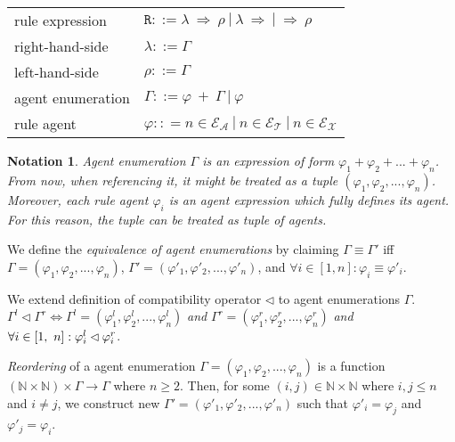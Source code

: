 \documentclass{entcs}
\renewcommand{\~}[0]{\texttildelow}
\newcommand{\choice}{|}
\newtheorem{notation}[thm]{Notation}
\begin{document}
\begin{center}
{\small
\hspace*{-1cm}\begin{tabular}{ l l }
 rule expression & $\mathtt{R} ::= \lambda ~\Rightarrow~ \rho ~|~ \lambda ~\Rightarrow ~|~ \Rightarrow~ \rho $\\
 right-hand-side & $\lambda ::= \Gamma$\\
 left-hand-side & $\rho ::= \Gamma$\\
 agent enumeration & $\Gamma ::= \varphi~ +~\Gamma ~|~ \varphi$\\
 rule agent & $\varphi :: = n \in \mathcal{E}_\mathcal{A}~\choice~n \in \mathcal{E}_\mathcal{T}~\choice~n \in \mathcal{E}_\mathcal{X}$\\
\end{tabular}
}
\end{center}

\begin{notation} \label{mynote}
Agent enumeration $\Gamma$ is an expression of form $\varphi_1 + \varphi_2 + ... + \varphi_n$. From now, when referencing it, it might be treated as a tuple $(\varphi_1, \varphi_2, ..., \varphi_n)$. Moreover, each rule agent $\varphi_i$ is an agent expression which fully defines its agent. For this reason, the tuple can be treated as tuple of agents. 
\end{notation} 

\begin{defn}
We define the \emph{equivalence of agent enumerations} by claiming $\Gamma \equiv \Gamma'$ iff $\Gamma = (\varphi_1, \varphi_2, ..., \varphi_n)$, $\Gamma' = (\varphi'_1, \varphi'_2, ..., \varphi'_n)$, and $\forall i \in [1, n]: \varphi_i \equiv \varphi'_i$.
\end{defn}

\begin{defn}
We extend definition of compatibility operator $\lhd$ to agent enumerations $\Gamma$. $\Gamma^{l} \lhd \Gamma^{r} \Leftrightarrow \Gamma^{l} = (\varphi^{l}_1, \varphi^{l}_2, ..., \varphi^{l}_n)$ \emph{and} $\Gamma^{r} = (\varphi^{r}_1, \varphi^{r}_2, ..., \varphi^{r}_n)$ \emph{and} $\\ \forall i \in [1,~n] : \varphi^{l}_i \lhd \varphi^{r}_i $.
\end{defn}

\begin{defn}
\emph{Reordering} of a agent enumeration $\Gamma = (\varphi_1, \varphi_2, ..., \varphi_n)$ is a function $(\mathbb{N} \times \mathbb{N}) \times \Gamma \rightarrow \Gamma$ where $n \geq 2$. Then, for some $(i, j) \in \mathbb{N} \times \mathbb{N}$ where $ i,j \leq n $ and $ i \neq j $, we construct new $\Gamma' = (\varphi'_1, \varphi'_2, ..., \varphi'_n)$ such that $\varphi'_i = \varphi_j$ and $\varphi'_j = \varphi_i$. 
\end{defn}
\end{document}
